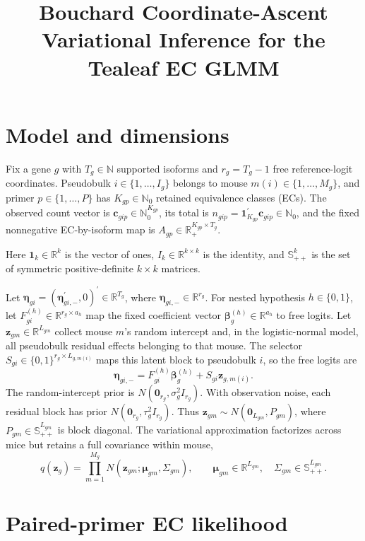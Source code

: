 \documentclass[11pt]{article}
\title{Bouchard Coordinate-Ascent Variational Inference for the Tealeaf EC GLMM}
\author{}
\date{}
\begin{document}
\maketitle

\section{Model and dimensions}

Fix a gene \(g\) with \(T_g\in\mathbb N\) supported isoforms and \(r_g=T_g-1\) free reference-logit coordinates. Pseudobulk \(i\in\{1,\ldots,I_g\}\) belongs to mouse \(m(i)\in\{1,\ldots,M_g\}\), and primer \(p\in\{1,\ldots,P\}\) has \(K_{gp}\in\mathbb N_0\) retained equivalence classes (ECs). The observed count vector is \(\bm c_{gip}\in\mathbb N_0^{K_{gp}}\), its total is \(n_{gip}=\bm1_{K_{gp}}^\prime\bm c_{gip}\in\mathbb N_0\), and the fixed nonnegative EC-by-isoform map is \(A_{gp}\in\mathbb R_+^{K_{gp}\times T_g}\).

Here \(\bm1_k\in\mathbb R^k\) is the vector of ones, \(I_k\in\mathbb R^{k\times k}\) is the identity, and \(\mathbb S_{++}^k\) is the set of symmetric positive-definite \(k\times k\) matrices.

Let \(\bm\eta_{gi}=(\bm\eta_{gi,-}^\prime,0)^\prime\in\mathbb R^{T_g}\), where \(\bm\eta_{gi,-}\in\mathbb R^{r_g}\). For nested hypothesis \(h\in\{0,1\}\), let \(F_{gi}^{(h)}\in\mathbb R^{r_g\times a_h}\) map the fixed coefficient vector \(\bm\beta_g^{(h)}\in\mathbb R^{a_h}\) to free logits. Let \(\bm z_{gm}\in\mathbb R^{L_{gm}}\) collect mouse \(m\)'s random intercept and, in the logistic-normal model, all pseudobulk residual effects belonging to that mouse. The selector \(S_{gi}\in\{0,1\}^{r_g\times L_{g,m(i)}}\) maps this latent block to pseudobulk \(i\), so the free logits are \[
 \bm\eta_{gi,-}=F_{gi}^{(h)}\bm\beta_g^{(h)}+S_{gi}\bm z_{g,m(i)}.
\]
The random-intercept prior is \(N(\bm0_{r_g},\sigma_g^2I_{r_g})\). With observation noise, each residual block has prior \(N(\bm0_{r_g},\tau_g^2I_{r_g})\). Thus \(\bm z_{gm}\sim N(\bm0_{L_{gm}},P_{gm})\), where \(P_{gm}\in\mathbb S_{++}^{L_{gm}}\) is block diagonal. The variational approximation factorizes across mice but retains a full covariance within mouse, \[
 q(\bm z_g)=\prod_{m=1}^{M_g}N(\bm z_{gm};\bm\mu_{gm},\Sigma_{gm}),
 \qquad \bm\mu_{gm}\in\mathbb R^{L_{gm}},\quad
 \Sigma_{gm}\in\mathbb S_{++}^{L_{gm}}.
\]

\section{Paired-primer EC likelihood}
\end{document}
